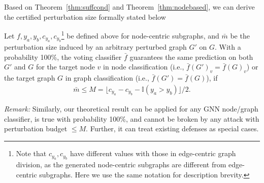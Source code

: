  Based on Theorem~\ref{thm:suffcond} and Theorem~\ref{thm:nodebased}, we can derive the certified perturbation size formally stated below


\begin{theorem}
\label{thm:certifynodebased} 
Let $f, y_a, y_b, c_{y_a}, c_{y_b}$\footnote{Note that $c_{y_a}, c_{y_b}$ have different values with those in edge-centric graph division, as the generated node-centric subgraphs are different from edge-centric subgraphs. Here we use the same notation for description brevity.} be defined above for node-centric subgraphs, and   
$\bar{m}$ be the perturbation size induced by an arbitrary perturbed graph $G'$ on $G$. 
With a probability 100\%, the voting classifier $\bar{f}$ guarantees the same prediction on both $G'$ and $G$ for the target node $v$ in node classification (i.e., $\bar{f}(G')_v = \bar{f}(G)_v$) or the target graph $G$ in graph classification (i.e., $\bar{f}(G') = \bar{f}(G)$), 
if 
\begin{align}
\label{eqn:cpz_node}
\bar{m} \leq M = {\lfloor c_{y_a}-c_{y_b}-\mathbb{I}(y_{a}>y_{b})\rfloor} / {2}.
\end{align}
\end{theorem}


\noindent \emph{Remark:} 
Similarly,  our theoretical result can be applied for any GNN node/graph classifier, is true with probability 100\%, {and cannot be broken by any attack with perturbation budget $\leq M$.} 
Further, it can treat existing defenses as special cases. 

